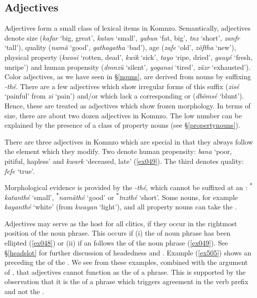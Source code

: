 \subsection{Adjectives} \label{adjectives}

Adjectives form a small class of lexical items in Komnzo. Semantically, adjectives denote size (\emph{kafar} `big, great', \emph{katan} `small', \emph{yabun} `fat, big', \emph{tnz} `short', \emph{zanfr} `tall'), quality (\emph{namä} `good', \emph{gathagatha} `bad'), age (\emph{zafe} `old', \emph{zöftha} `new'), physical property (\emph{kwosi} `rotten, dead', \emph{kwik} `sick', \emph{tayo} `ripe, dried', \emph{gauyé} `fresh, unripe') and human propensity (\emph{dmnzü} `silent', \emph{yoganai} `tired', \emph{zäzr} `exhausted'). Color adjectives, as we have seen in \S{}\ref{nouns}, are derived from nouns by suffixing \emph{-thé}. There are a few adjectives which show irregular forms of this suffix (\emph{zisé} `painful' from \emph{zi} `pain') and/or which lack a corresponding  or  (\emph{dbömsé} `blunt'). Hence, these are treated as adjectives which show frozen morphology. In terms of size, there are about two dozen adjectives in Komnzo. The low number can be explained by the presence of a class of property nouns (see \S{}\ref{propertynouns}).%

There are three adjectives in Komnzo which are special in that they always follow the element which they modify. Two denote human propensity: \emph{bana} `poor, pitiful, hapless' and \emph{kwark} `deceased, late' (\ref{ex049}). The third denotes quality: \emph{fefe} `true'.%

Morphological evidence is provided by the  \emph{-thé}, which cannot be suffixed at an : \textsuperscript{$\ast$}\emph{katanthé} `small', \textsuperscript{$\ast$}\emph{namäthé} `good' or \textsuperscript{$\ast$}\emph{tnzthé} `short'. Some nouns, for example \emph{kayanthé} `white' (from \emph{kwayan} `light'), and all property nouns can take the .%

Adjectives may serve as the host for all  clitics, if they occur in the rightmost position of the noun phrase. This occurs if (i) the  of noun phrase has been ellipted (\ref{ex048}) or (ii) if an  follows the  of the noun phrase (\ref{ex049}). See \S{}\ref{headslot} for further discussion of headedness and . Example (\ref{ex505}) shows an  preceding the  of the . We see from these examples, combined with the argument of , that adjectives cannot function as the  of a phrase. This is supported by the observation that it is the  of a phrase which triggers agreement in the verb prefix and not the .

